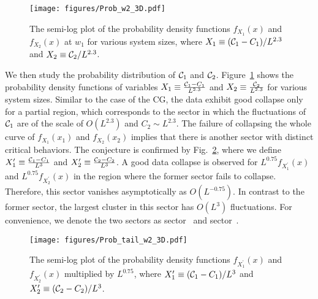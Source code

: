 \begin{figure}[t]
	\vspace{3ex}
	\centering
	\texttt{[image: figures/Prob\_w2\_3D.pdf]}
	\caption{The semi-log plot of the probability density functions $f_{X_1}(x)$ and $f_{X_2}(x)$ at $w_1$ for various system sizes, 
	where $X_1 \equiv ({\mathcal C}_1 - C_1)/L^{2.3}$ and $X_2 \equiv {\mathcal C}_2/L^{2.3}$.}
	\label{fig:prob_w2_3D}
	\vspace{3ex}
\end{figure}

We then study the probability distribution of ${\mathcal C}_1$ and ${\mathcal C}_2$. Figure~\ref{fig:prob_w2_3D} shows the probability density 
functions of variables $X_1 \equiv \frac{{\mathcal C}_1 - C_1}{L^{2.3}}$ and $X_2 \equiv \frac{{\mathcal C}_2}{L^{2.3}}$ for various system sizes. 
Similar to the case of the CG, the data exhibit good collapse only for a partial region, which corresponds to the sector in which
the fluctuations of ${\mathcal C}_1$ are of the scale of $O(L^{2.3})$ and $C_2 \sim L^{2.3}$. The failure of collapsing the whole curve
of $f_{X_1}(x_1)$ and $f_{X_2}(x_2)$ implies that there is another sector with distinct critical behaviors.
The conjecture is confirmed by Fig.~\ref{fig:prob_w2_3D_tail}, where we define $X_1^\prime \equiv \frac{{\mathcal C}_1 - C_1}{L^3}$ and $X_2^\prime \equiv \frac{{\mathcal C}_2 - C_2}{L^3}$.
A good data collapse is observed for $L^{0.75}f_{X_1^\prime}(x)$ and $L^{0.75}f_{X_2^\prime}(x)$ in the region where the former sector fails to collapse.
Therefore, this sector vanishes asymptotically as $O(L^{-0.75})$. In contrast to the former sector, the largest cluster in this sector has $O(L^3)$ fluctuations.
For convenience, we denote the two sectors as sector~ and sector~.


\begin{figure}[h]
	\vspace{3ex}
	\centering
	\texttt{[image: figures/Prob\_tail\_w2\_3D.pdf]}
	\caption{The semi-log plot of the probability density functions $f_{X_1^\prime}(x)$ and $f_{X_2^\prime}(x)$ multiplied by $L^{0.75}$, 
	where $X_1^\prime \equiv ({\mathcal C}_1 - C_1)/L^{3}$ and $X_2^\prime \equiv ({\mathcal C}_2 - C_2)/L^{3}$.}
	\label{fig:prob_w2_3D_tail}
	\vspace{3ex}
\end{figure}

